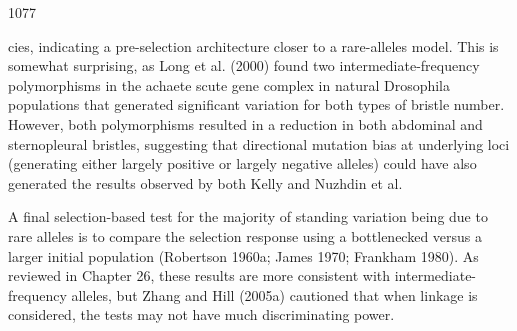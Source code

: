 \documentclass{article}
\begin{document}
1077

cies, indicating a pre-selection architecture closer to a rare-alleles model. This is somewhat surprising, as Long et al. (2000) found two intermediate-frequency polymorphisms in the achaete scute gene complex in natural Drosophila populations that generated significant variation for both types of bristle number. However, both polymorphisms resulted in a reduction in both abdominal and sternopleural bristles, suggesting that directional mutation bias at underlying loci (generating either largely positive or largely negative alleles) could have also generated the results observed by both Kelly and Nuzhdin et al.

A final selection-based test for the majority of standing variation being due to rare alleles is to compare the selection response using a bottlenecked versus a larger initial population (Robertson 1960a; James 1970; Frankham 1980). As reviewed in Chapter 26, these results are more consistent with intermediate-frequency alleles, but Zhang and Hill (2005a) cautioned that when linkage is considered, the tests may not have much discriminating power.
\end{document}
